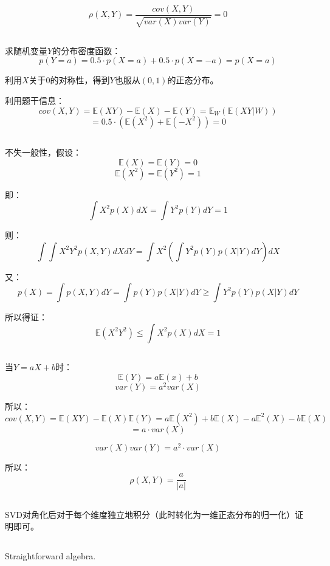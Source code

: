 \documentclass[UTF8]{ctexart}
\begin{document}
$$\rho(X,Y)=\frac{cov(X,Y)}{\sqrt{var(X)var(Y)}}=0$$

\subsection{}
求随机变量$Y$的分布密度函数：
$$p(Y=a)=0.5 \cdot p(X=a) + 0.5 \cdot p(X=-a)=p(X=a)$$

利用$X$关于$0$的对称性，得到$Y$也服从$(0,1)$的正态分布。

利用题干信息：
$$cov(X,Y)=\mathbb{E}(XY)-\mathbb{E}(X)-\mathbb{E}(Y) = \mathbb{E}_{W}(\mathbb{E}(XY|W))$$
$$=0.5\cdot(\mathbb{E}(X^{2})+\mathbb{E}(-X^{2}))=0$$

\subsection{}
不失一般性，假设：
$$\mathbb{E}(X)=\mathbb{E}(Y)=0$$
$$\mathbb{E}(X^{2})=\mathbb{E}(Y^{2})=1$$

即：
$$\int X^{2}p(X)dX = \int Y^{2}p(Y) dY = 1$$

则：
$$\int \int X^{2}Y^{2}p(X,Y)dXdY = \int X^{2} (\int Y^{2}p(Y)p(X|Y)dY)dX$$

又：
$$p(X)=\int p(X,Y)dY = \int p(Y)p(X|Y)dY \geq \int Y^{2}p(Y)p(X|Y)dY$$

所以得证：
$$\mathbb{E}(X^{2}Y^{2}) \leq \int X^{2}p(X)dX = 1$$

\subsection{}
当$Y=aX+b$时：
$$\mathbb{E}(Y)=a\mathbb{E}(x)+b$$
$$var(Y)=a^{2}var(X)$$

所以：
$$cov(X,Y)=\mathbb{E}(XY)-\mathbb{E}(X)\mathbb{E}(Y)=a\mathbb{E}(X^{2})+b\mathbb{E}(X)-a\mathbb{E}^{2}(X)-b\mathbb{E}(X)$$
$$=a\cdot var(X)$$

$$var(X)var(Y) = a^{2}\cdot var(X)$$

所以：
$$\rho(X,Y) = \frac{a}{|a|}$$

\subsection{}
SVD对角化后对于每个维度独立地积分（此时转化为一维正态分布的归一化）证明即可。

\subsection{}
Straightforward algebra.
\end{document}
